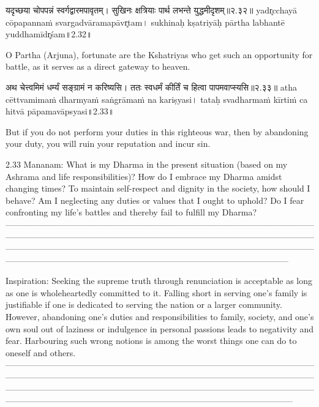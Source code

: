यदृच्छया चोपपन्नं स्वर्गद्वारमपावृतम्।
सुखिनः क्षत्रियाः पार्थ लभन्ते युद्धमीदृशम्॥२.३२॥
yadr̥cchayā cōpapannaṁ svargadvāramapāvr̥tam।
sukhinaḥ kṣatriyāḥ pārtha labhantē yuddhamīdr̥śam॥2.32॥

O Partha (Arjuna), fortunate are the Kshatriyas who get such an opportunity for battle, as it serves as a direct gateway to heaven.


अथ चेत्त्वमिमं धर्म्यं सङ्ग्रामं न करिष्यसि। 
ततः स्वधर्मं कीर्तिं च हित्वा पापमवाप्स्यसि॥२.३३॥
atha cēttvamimaṁ dharmyaṁ saṅgrāmaṁ na kariṣyasi। 
tataḥ svadharmaṁ kīrtiṁ ca hitvā pāpamavāpsyasi॥2.33॥

But if you do not perform your duties in this righteous war, then by abandoning your duty, you will ruin your reputation and incur sin.

2.33 Mananam:
What is my Dharma in the present situation (based on my Ashrama and life responsibilities)? How do I embrace my Dharma amidst changing times? To maintain self-respect and dignity in the society, how should I behave? Am I neglecting any duties or values that I ought to uphold? Do I fear confronting my life’s battles and thereby fail to fulfill my Dharma?
—------------------------------------------------------------------------------------------------------------------------------------------------------------------------------------------------------------------------------------------------------------------------------------------------------------------------------------------------------------------------------------------------------------------------------------



Inspiration:
Seeking the supreme truth through renunciation is acceptable as long as one is wholeheartedly committed to it. Falling short in serving one’s family is justifiable if one is dedicated to serving the nation or a larger community. However, abandoning one’s duties and responsibilities to family, society, and one’s own soul out of laziness or indulgence in personal passions leads to negativity and fear. Harbouring such wrong notions is among the worst things one can do to oneself and others.
—--------------------------------------------------------------------------------------------------------------------------------------------------------------------------------------------------------------------------------------------------------------------------------------------------------------------------------------------------------------------------------------------------------------------------------------



